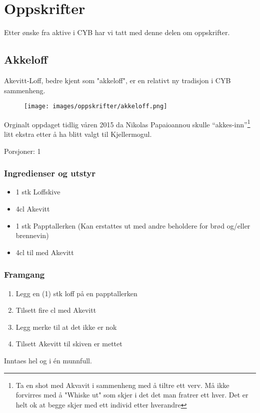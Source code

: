 \chapter*{Oppskrifter}

Etter ønske fra aktive i CYB har vi tatt med denne delen om oppskrifter.

\section*{Akkeloff}

Akevitt-Loff, bedre kjent som "akkeloff", er en relativt ny tradisjon i CYB sammenheng. 

\begin{figure}
	\texttt{[image: images/oppskrifter/akkeloff.png]}
\end{figure}

Orginalt oppdaget tidlig våren 2015 da Nikolas Papaioannou skulle ``akkes-inn''\footnote{Ta en shot med Akvavit i sammenheng med å tiltre ett verv. Må ikke forvirres med å "Whiske ut" som skjer i det det man fratrer ett hver. Det er helt ok at begge skjer med ett individ etter hverandre} litt ekstra etter å ha blitt valgt til Kjellermogul.

Porsjoner: 1

\subsection*{Ingredienser og utstyr}

\begin{itemize}
	\item 1 stk Loffskive
	\item 4cl Akevitt
	\item 1 stk Papptallerken (Kan erstattes ut med andre beholdere for brød og/eller brennevin)
	\item 4cl til med Akevitt
\end{itemize}

\subsection*{Framgang}

\begin{enumerate}
	\item Legg en (1) stk loff på en papptallerken
	\item Tilsett fire cl med Akevitt
	\item Legg merke til at det ikke er nok
	\item Tilsett Akevitt til skiven er mettet
\end{enumerate}

Inntaes hel og i én munnfull. 
